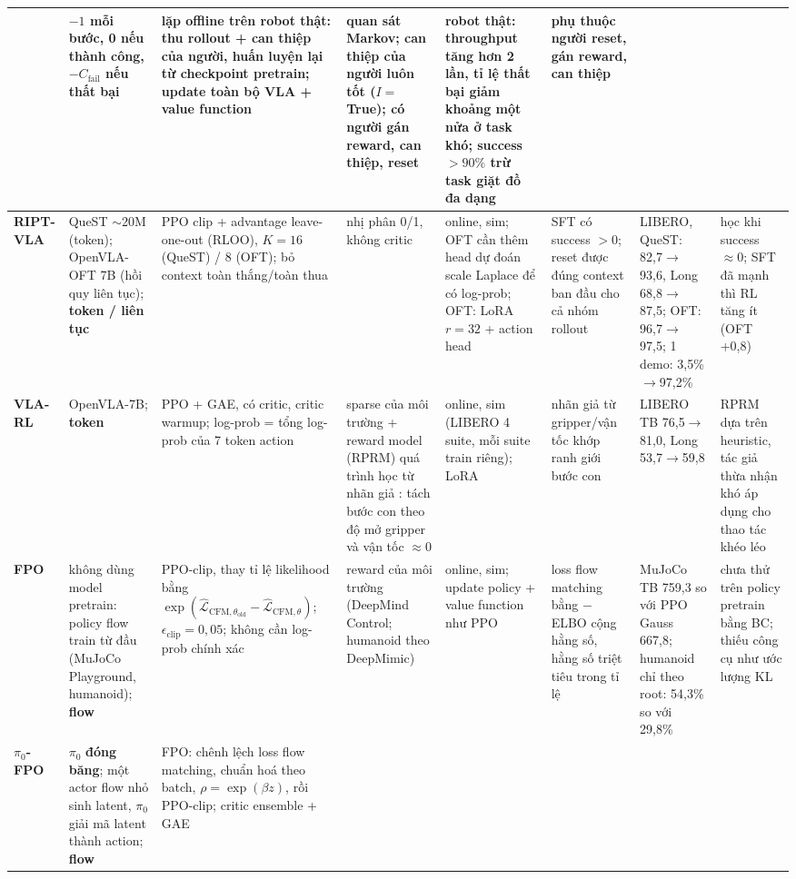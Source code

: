 \documentclass[9pt,a4paper]{extarticle}
\begin{document}
{\begin{longtable}{@{}L{2.0cm} L{2.6cm} L{3.6cm} L{2.7cm} L{3.0cm} L{3.0cm} L{3.3cm} L{3.4cm}@{}}
& $-1$ mỗi bước, 0 nếu thành công, $-C_{\text{fail}}$ nếu thất bại
& lặp offline trên robot thật: thu rollout + can thiệp của người, huấn luyện lại từ checkpoint pretrain; update toàn bộ VLA + value function
& quan sát Markov; can thiệp của người luôn tốt ($I=$ True); có người gán reward, can thiệp, reset
& robot thật: throughput tăng hơn 2 lần, tỉ lệ thất bại giảm khoảng một nửa ở task khó; success $>90\%$ trừ task giặt đồ đa dạng
& phụ thuộc người reset, gán reward, can thiệp \\
\midrule
\textbf{RIPT-VLA} 
& QueST $\sim$20M (token); OpenVLA-OFT 7B (hồi quy liên tục); \textbf{token / liên tục}
& PPO clip + advantage leave-one-out (RLOO), $K=16$ (QueST) / 8 (OFT); bỏ context toàn thắng/toàn thua
& nhị phân 0/1, không critic
& online, sim; OFT cần thêm head dự đoán scale Laplace để có log-prob; OFT: LoRA $r=32$ + action head
& SFT có success $>0$; reset được đúng context ban đầu cho cả nhóm rollout
& LIBERO, QueST: 82,7$\to$93,6, Long 68,8$\to$87,5; OFT: 96,7$\to$97,5; 1 demo: 3,5\%$\to$97,2\%
& học khi success $\approx0$; SFT đã mạnh thì RL tăng ít (OFT +0,8) \\
\midrule
\textbf{VLA-RL}
& OpenVLA-7B; \textbf{token}
& PPO + GAE, có critic, critic warmup; log-prob = tổng log-prob của 7 token action
& sparse của môi trường + reward model (RPRM) quá trình học từ nhãn giả : tách bước con theo độ mở gripper và vận tốc $\approx0$
& online, sim (LIBERO 4 suite, mỗi suite train riêng); LoRA
& nhãn giả từ gripper/vận tốc khớp ranh giới bước con
& LIBERO TB 76,5$\to$81,0, Long 53,7$\to$59,8
& RPRM dựa trên heuristic, tác giả thừa nhận khó áp dụng cho thao tác khéo léo \\
\midrule
\textbf{FPO} 
& không dùng model pretrain: policy flow train từ đầu (MuJoCo Playground, humanoid); \textbf{flow}
& PPO-clip, thay tỉ lệ likelihood bằng $\exp(\hat{\mathcal L}_{\text{CFM},\theta_{\text{old}}}-\hat{\mathcal L}_{\text{CFM},\theta})$; $\epsilon_{\text{clip}}=0{,}05$; không cần log-prob chính xác
& reward của môi trường (DeepMind Control; humanoid theo DeepMimic)
& online, sim; update policy + value function như PPO
& loss flow matching bằng $-$ELBO cộng hằng số, hằng số triệt tiêu trong tỉ lệ
& MuJoCo TB 759,3 so với PPO Gauss 667,8; humanoid chỉ theo root: 54,3\% so với 29,8\%
& chưa thử trên policy pretrain bằng BC; thiếu công cụ như ước lượng KL\\
\midrule
\textbf{$\pi_0$-FPO}
& $\pi_0$ \textbf{đóng băng}; một actor flow nhỏ sinh latent, $\pi_0$ giải mã latent thành action; \textbf{flow}
& FPO: chênh lệch loss flow matching, chuẩn hoá theo batch, $\rho=\exp(\beta z)$, rồi PPO-clip; critic ensemble + GAE

\end{longtable}}
\end{document}
